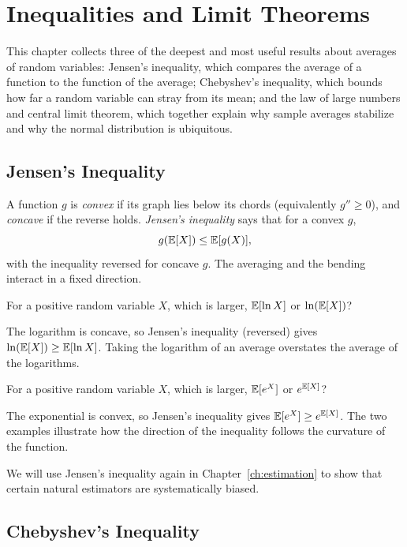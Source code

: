 \chapter{Inequalities and Limit Theorems}
\label{ch:limits}

This chapter collects three of the deepest and most useful results about
averages of random variables: Jensen's inequality, which compares the average of
a function to the function of the average; Chebyshev's inequality, which bounds
how far a random variable can stray from its mean; and the law of large numbers
and central limit theorem, which together explain why sample averages stabilize
and why the normal distribution is ubiquitous.

\section{Jensen's Inequality}

A function $g$ is \emph{convex} if its graph lies below its chords (equivalently
$g''\ge 0$), and \emph{concave} if the reverse holds. \emph{Jensen's inequality}
says that for a convex $g$,
\[
  g(\mathbb{E}[X])\le \mathbb{E}[g(X)],
\]
with the inequality reversed for concave $g$. The averaging and the bending
interact in a fixed direction.

\begin{example}
For a positive random variable $X$, which is larger, $\mathbb{E}[\ln X]$ or
$\ln(\mathbb{E}[X])$?

\solution The logarithm is concave, so Jensen's inequality (reversed) gives
$\ln(\mathbb{E}[X])\ge\mathbb{E}[\ln X]$. Taking the logarithm of an average overstates the
average of the logarithms.
\end{example}

\begin{example}
For a positive random variable $X$, which is larger, $\mathbb{E}[e^X]$ or $e^{\mathbb{E}[X]}$?

\solution The exponential is convex, so Jensen's inequality gives
$\mathbb{E}[e^X]\ge e^{\mathbb{E}[X]}$. The two examples illustrate how the direction of the
inequality follows the curvature of the function.
\end{example}

We will use Jensen's inequality again in Chapter~\ref{ch:estimation} to show that
certain natural estimators are systematically biased.

\section{Chebyshev's Inequality}


